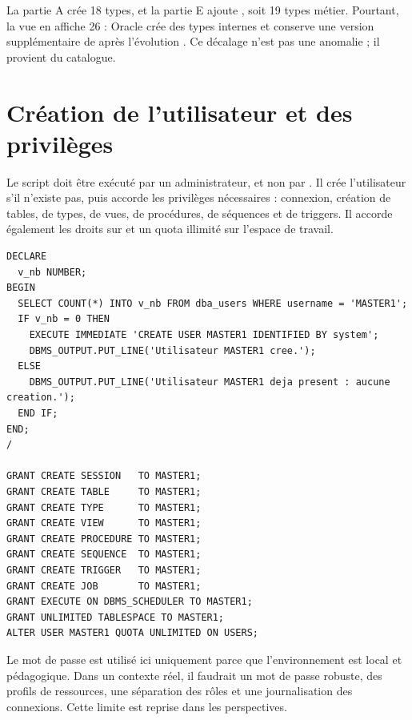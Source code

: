 \begin{remarquebox}
La partie A crée 18 types, et la partie E ajoute , soit
19 types métier. Pourtant, la vue  en affiche 26 : Oracle
crée des types internes  et conserve une version
supplémentaire de  après l'évolution
. Ce décalage n'est pas une anomalie ; il
provient du catalogue.
\end{remarquebox}

\section{Création de l'utilisateur et des privilèges}

Le script  doit être exécuté par un
administrateur, et non par . Il crée l'utilisateur s'il n'existe
pas, puis accorde les privilèges nécessaires : connexion, création de tables,
de types, de vues, de procédures, de séquences et de triggers. Il accorde
également les droits sur  et un quota illimité sur
l'espace de travail.

\begin{lstlisting}[caption={Création idempotente de l'utilisateur \code{MASTER1}.},label={lst:creation-utilisateur}]
DECLARE
  v_nb NUMBER;
BEGIN
  SELECT COUNT(*) INTO v_nb FROM dba_users WHERE username = 'MASTER1';
  IF v_nb = 0 THEN
    EXECUTE IMMEDIATE 'CREATE USER MASTER1 IDENTIFIED BY system';
    DBMS_OUTPUT.PUT_LINE('Utilisateur MASTER1 cree.');
  ELSE
    DBMS_OUTPUT.PUT_LINE('Utilisateur MASTER1 deja present : aucune creation.');
  END IF;
END;
/

GRANT CREATE SESSION   TO MASTER1;
GRANT CREATE TABLE     TO MASTER1;
GRANT CREATE TYPE      TO MASTER1;
GRANT CREATE VIEW      TO MASTER1;
GRANT CREATE PROCEDURE TO MASTER1;
GRANT CREATE SEQUENCE  TO MASTER1;
GRANT CREATE TRIGGER   TO MASTER1;
GRANT CREATE JOB       TO MASTER1;
GRANT EXECUTE ON DBMS_SCHEDULER TO MASTER1;
GRANT UNLIMITED TABLESPACE TO MASTER1;
ALTER USER MASTER1 QUOTA UNLIMITED ON USERS;
\end{lstlisting}

\begin{attentionbox}[Sécurité]
Le mot de passe  est utilisé ici uniquement parce que
l'environnement est local et pédagogique. Dans un contexte réel, il faudrait un
mot de passe robuste, des profils de ressources, une séparation des rôles et
une journalisation des connexions. Cette limite est reprise dans les
perspectives.
\end{attentionbox}

